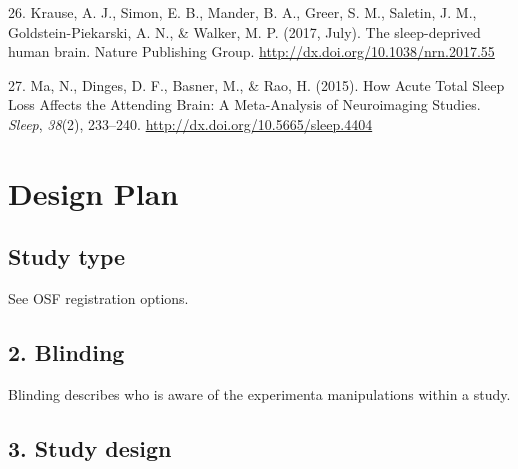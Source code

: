 \documentclass[
  english,
  man]{apa6}
\newlength{\cslhangindent}
\newenvironment{cslreferences}%
  {\setlength{\parindent}{0pt}%
  \everypar{\setlength{\hangindent}{\cslhangindent}}\ignorespaces}%
  {\par}
\begin{document}
\begin{cslreferences}
\leavevmode\hypertarget{ref-Krause2017}{}%
26. Krause, A. J., Simon, E. B., Mander, B. A., Greer, S. M., Saletin, J. M., Goldstein-Piekarski, A. N., \& Walker, M. P. (2017, July). The sleep-deprived human brain. Nature Publishing Group. \url{http://dx.doi.org/10.1038/nrn.2017.55}

\leavevmode\hypertarget{ref-Ma2015}{}%
27. Ma, N., Dinges, D. F., Basner, M., \& Rao, H. (2015). How Acute Total Sleep Loss Affects the Attending Brain: A Meta-Analysis of Neuroimaging Studies. \emph{Sleep}, \emph{38}(2), 233--240. \url{http://dx.doi.org/10.5665/sleep.4404}
\end{cslreferences}

\endgroup

\newpage

\hypertarget{design-plan}{%
\section{Design Plan}\label{design-plan}}

\hypertarget{study-type}{%
\subsection{Study type}\label{study-type}}

See OSF registration options.

\hypertarget{blinding}{%
\subsection{2. Blinding}\label{blinding}}

Blinding describes who is aware of the experimenta manipulations within a study.

\hypertarget{study-design}{%
\subsection{3. Study design}\label{study-design}}

\newpage
\end{document}
